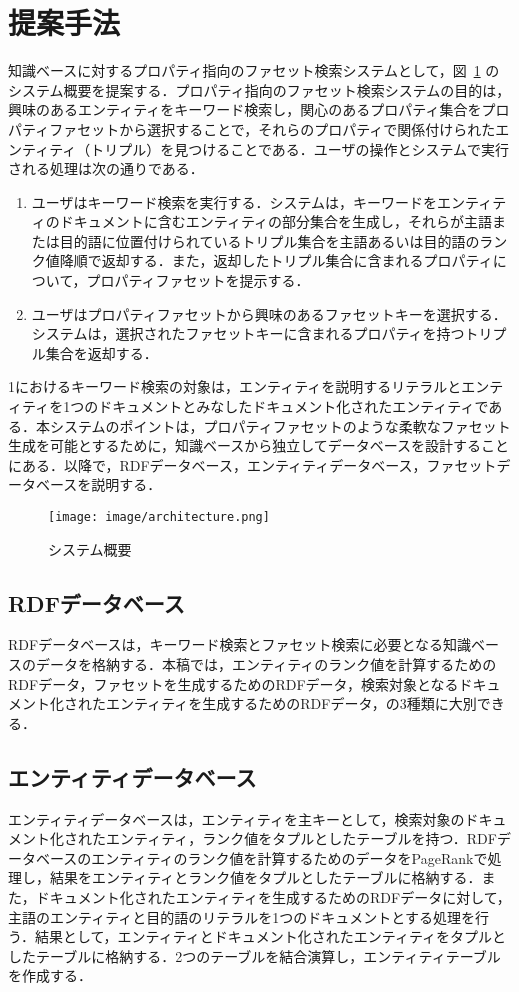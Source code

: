 \section{提案手法}
\label{sec:proposal}
知識ベースに対するプロパティ指向のファセット検索システムとして，図~\ref{fig:architecture} のシステム概要を提案する．プロパティ指向のファセット検索システムの目的は，興味のあるエンティティをキーワード検索し，関心のあるプロパティ集合をプロパティファセットから選択することで，それらのプロパティで関係付けられたエンティティ（トリプル）を見つけることである．ユーザの操作とシステムで実行される処理は次の通りである．
\begin{enumerate}
	\item ユーザはキーワード検索を実行する．システムは，キーワードをエンティティのドキュメントに含むエンティティの部分集合を生成し，それらが主語または目的語に位置付けられているトリプル集合を主語あるいは目的語のランク値降順で返却する．また，返却したトリプル集合に含まれるプロパティについて，プロパティファセットを提示する．
	\item ユーザはプロパティファセットから興味のあるファセットキーを選択する．システムは，選択されたファセットキーに含まれるプロパティを持つトリプル集合を返却する．
\end{enumerate}

1におけるキーワード検索の対象は，エンティティを説明するリテラルとエンティティを1つのドキュメントとみなしたドキュメント化されたエンティティである．本システムのポイントは，プロパティファセットのような柔軟なファセット生成を可能とするために，知識ベースから独立してデータベースを設計することにある．以降で，RDFデータベース，エンティティデータベース，ファセットデータベースを説明する．
%
\begin{figure}[h]
\centering
\texttt{[image: image/architecture.png]}
\caption{\small
システム概要
}
\label{fig:architecture}
\end{figure}
%
\subsection{RDFデータベース}
RDFデータベースは，キーワード検索とファセット検索に必要となる知識ベースのデータを格納する．本稿では，エンティティのランク値を計算するためのRDFデータ，ファセットを生成するためのRDFデータ，検索対象となるドキュメント化されたエンティティを生成するためのRDFデータ，の3種類に大別できる．
%
\subsection{エンティティデータベース}
エンティティデータベースは，エンティティを主キーとして，検索対象のドキュメント化されたエンティティ，ランク値をタプルとしたテーブルを持つ．RDFデータベースのエンティティのランク値を計算するためのデータをPageRankで処理し，結果をエンティティとランク値をタプルとしたテーブルに格納する．また，ドキュメント化されたエンティティを生成するためのRDFデータに対して，主語のエンティティと目的語のリテラルを1つのドキュメントとする処理を行う．結果として，エンティティとドキュメント化されたエンティティをタプルとしたテーブルに格納する．2つのテーブルを結合演算し，エンティティテーブルを作成する．
%
